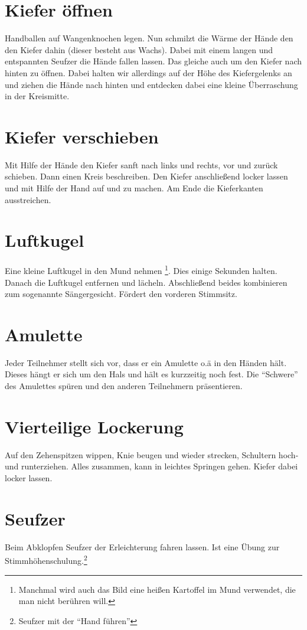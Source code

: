 \documentclass[ngerman, a4paper, twoside]{scrbook}%
\begin{document}
	\section{Kiefer öffnen}
	Handballen auf Wangenknochen legen. Nun schmilzt die Wärme der Hände den den Kiefer dahin (dieser besteht aus Wachs). Dabei mit einem langen und entspannten Seufzer die Hände fallen lassen. Das gleiche auch um den Kiefer nach hinten zu öffnen. Dabei halten wir allerdings auf der Höhe des Kiefergelenks an und ziehen die Hände nach hinten und entdecken dabei eine kleine Überraschung in der Kreismitte.

	 \section{Kiefer verschieben}
	 Mit Hilfe der Hände den Kiefer sanft nach links und rechts, vor und zurück schieben. Dann einen Kreis beschreiben. Den Kiefer anschließend locker lassen und mit Hilfe der Hand auf und zu machen.  Am Ende die Kieferkanten ausstreichen.

	 \section{Luftkugel}
	 Eine kleine Luftkugel in den Mund nehmen \footnote{Manchmal wird auch das Bild eine heißen Kartoffel im Mund verwendet, die man nicht berühren will.}. Dies einige Sekunden halten. Danach die Luftkugel entfernen und lächeln. Abschließend beides kombinieren zum sogenannte Sängergesicht. Fördert den vorderen Stimmsitz.

	 \section{Amulette}
	 Jeder Teilnehmer stellt sich vor, dass er ein Amulette o.ä in den Händen hält. Dieses hängt er sich um den Hals und hält es kurzzeitig noch fest. Die "`Schwere"' des Amulettes spüren und den anderen Teilnehmern präsentieren.

	 \section{Vierteilige Lockerung}
	 Auf den Zehenspitzen wippen, Knie beugen und wieder strecken, Schultern hoch- und runterziehen. Alles zusammen, kann in leichtes Springen gehen. Kiefer dabei locker lassen.

	 \section{Seufzer}
	 Beim Abklopfen Seufzer der Erleichterung fahren lassen. Ist eine Übung zur Stimmhöhenschulung.\footnote{Seufzer mit der "`Hand führen"'}
\end{document}
